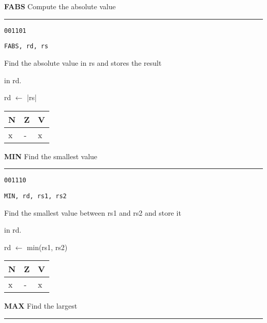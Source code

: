 \documentclass{article}
\begin{document}
\bigskip\bigskip

\flushleft
\LARGE\textbf{FABS} \large \hfill Compute the absolute value

\kern-3pt
\noindent\rule{16.5cm}{0.4pt}
\normalsize

{\large
	 \texttt{001101} \par
	\smallbreak
	 \texttt{FABS, rd, rs} \par
	\smallbreak
	 Find the absolute value in rs and stores the result \par
	\makebox[3.5cm][l]{  } in rd. \par
	\smallbreak
	 rd $\leftarrow$ |rs| \par
	\smallbreak
	 \begin{tabular}{lll} N \quad & Z \quad & V \\ \hline x & - & x \\ \end{tabular}
}

\bigskip\bigskip

\flushleft
\LARGE\textbf{MIN} \large \hfill Find the smallest value

\kern-3pt
\noindent\rule{16.5cm}{0.4pt}
\normalsize

{\large
	 \texttt{001110} \par
	\smallbreak
	 \texttt{MIN, rd, rs1, rs2} \par
	\smallbreak
	 Find the smallest value between rs1 and rs2 and store it \par
	\makebox[3.5cm][l]{  } in rd. \par
	\smallbreak
	 rd $\leftarrow$ min(rs1, rs2) \par
	\smallbreak
	 \begin{tabular}{lll} N \quad & Z \quad & V \\ \hline x & - & x \\ \end{tabular}
}

\pagebreak

\flushleft
\LARGE\textbf{MAX} \large \hfill Find the largest

\kern-3pt
\noindent\rule{16.5cm}{0.4pt}
\normalsize
\end{document}
